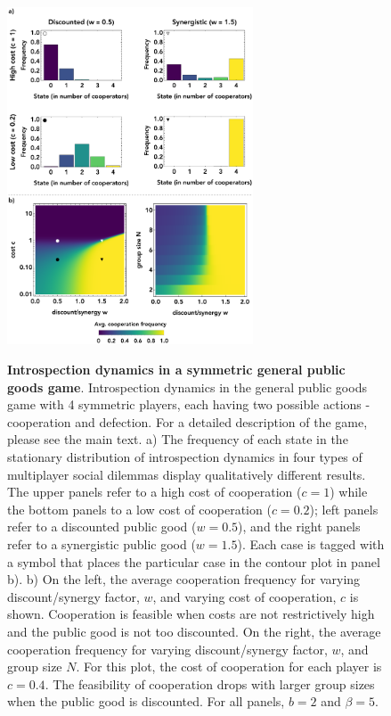 \documentclass[11pt]{article}
\theoremstyle{plainCl1}
\theoremstyle{plainCl2}
\begin{document}
\begin{figure}
\centering
\includegraphics[width =  0.65\textwidth, keepaspectratio]{figures/Fig3.eps}~\\[0.4cm]
\caption{\onehalfspacing
\textbf{Introspection dynamics in a symmetric general public goods game}. Introspection dynamics in the general public goods game with 4 symmetric players, each having two possible actions - cooperation and defection. For a detailed description of the game, please see the main text. a) The frequency of each state in the stationary distribution of introspection dynamics in four types of multiplayer social dilemmas display qualitatively different results. The upper panels refer to a high cost of cooperation ($c=1$) while the bottom panels to a low cost of cooperation ($c = 0.2$); left panels refer to a discounted public good ($w = 0.5$), and the right panels refer to a synergistic public good ($w = 1.5$). Each case is tagged with a symbol that places the particular case in the contour plot in panel b). b) On the left, the average cooperation frequency for varying discount/synergy factor, $w$, and varying cost of cooperation, $c$ is shown. Cooperation is feasible when costs are not restrictively high and the public good is not too discounted. On the right, the average cooperation frequency for varying discount/synergy factor, $w$, and group size $N$. For this plot, the cost of cooperation for each player is $c = 0.4$. The feasibility of cooperation drops with larger group sizes when the public good is discounted. For all panels, $b=2$ and $\beta = 5$.} 
\label{Fig:GPGG-symmetric}
\end{figure}
\end{document}
